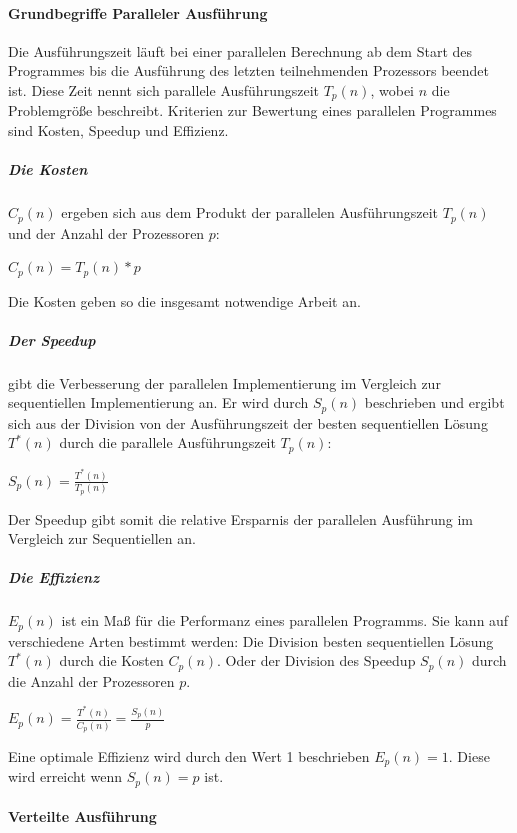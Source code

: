 \documentclass[a4paper,10pt]{article}
\numberwithin{figure}{section}
\numberwithin{table}{section}
\begin{document}
\paragraph{Grundbegriffe Paralleler Ausführung}

Die Ausführungszeit läuft bei einer parallelen Berechnung ab dem Start des Programmes bis die Ausführung des letzten teilnehmenden Prozessors beendet ist\cite{ppRauberRuenger}.
Diese Zeit nennt sich parallele Ausführungszeit $T_p(n)$, wobei $n$ die Problemgröße beschreibt.
Kriterien zur Bewertung eines parallelen Programmes sind Kosten, Speedup und Effizienz.

\subparagraph{Die Kosten}\cite[180]{ppRauberRuenger} $C_p(n)$ ergeben sich aus dem Produkt der parallelen Ausführungszeit $T_p(n)$ und der Anzahl der Prozessoren $p$:

\begin{center}
$C_p(n) = T_p(n) * p$
\end{center}

Die Kosten geben so die insgesamt notwendige Arbeit an.

\subparagraph{Der Speedup}\cite[180-182]{ppRauberRuenger} gibt die Verbesserung der parallelen Implementierung im Vergleich zur sequentiellen Implementierung an.
Er wird durch $S_p(n)$ beschrieben und ergibt sich aus der Division von der Ausführungszeit der besten sequentiellen Lösung $T^*(n)$ durch die parallele Ausführungszeit $T_p(n)$:

\begin{center}
$S_p(n) = \frac{T^*(n)}{T_p(n)}$
\end{center}

Der Speedup gibt somit die relative Ersparnis der parallelen Ausführung im Vergleich zur Sequentiellen an.

\subparagraph{Die Effizienz}\cite[182-183]{ppRauberRuenger} $E_p(n)$ ist ein Maß für die Performanz eines parallelen Programms.
Sie kann auf verschiedene Arten bestimmt werden:
Die Division besten sequentiellen Lösung $T^*(n)$ durch die Kosten $C_p(n)$.
Oder der Division des Speedup $S_p(n)$ durch die Anzahl der Prozessoren $p$.

\begin{center}
$E_p(n) = \frac{T^*(n)}{C_p(n)} = \frac{S_p(n)}{p}$
\end{center}

Eine optimale Effizienz wird durch den Wert 1 beschrieben $E_p(n) = 1$.
Diese wird erreicht wenn $S_p(n) = p$ ist.

\paragraph{Verteilte Ausführung}
\end{document}
